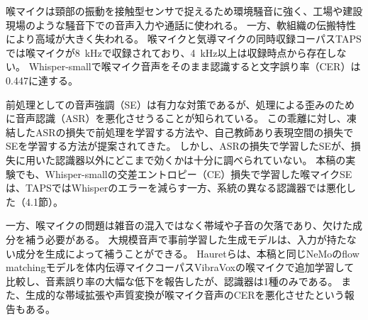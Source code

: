 \documentclass[xelatex,ja=standard,a4paper,twocolumn,10pt]{bxjsarticle}
\makeatletter
\renewcommand{\section}{\@startsection{section}{1}{\z@}{1.0ex plus .3ex}{.5ex}{\normalfont\large\sffamily\bfseries}}
\makeatother
\begin{document}

\section{はじめに}
喉マイクは頸部の振動を接触型センサで捉えるため環境騒音に強く、工場や建設現場のような騒音下での音声入力や通話に使われる。
一方、軟組織の伝搬特性により高域が大きく失われる。
喉マイクと気導マイクの同時収録コーパスTAPS\cite{taps}では喉マイクが8~kHzで収録されており、4~kHz以上は収録時点から存在しない。
Whisper-small\cite{whisper}で喉マイク音声をそのまま認識すると文字誤り率（CER）は0.447に達する。

前処理としての音声強調（SE）は有力な対策であるが、処理による歪みのために音声認識（ASR）を悪化させうることが知られている\cite{ochiai2024}。
この乖離に対し、凍結したASRの損失で前処理を学習する方法\cite{dissen2024}や、自己教師あり表現空間の損失でSEを学習する方法\cite{sato2025}が提案されてきた。
しかし、ASRの損失で学習したSEが、損失に用いた認識器以外にどこまで効くかは十分に調べられていない。
本稿の実験でも、Whisper-smallの交差エントロピー（CE）損失で学習した喉マイクSEは、TAPSではWhisperのエラーを減らす一方、系統の異なる認識器では悪化した（4.1節）。

一方、喉マイクの問題は雑音の混入ではなく帯域や子音の欠落であり、欠けた成分を補う必要がある。
大規模音声で事前学習した生成モデル\cite{ku2024}は、入力が持たない成分を生成によって補うことができる。
Hauretら\cite{hauret2025rt}は、本稿と同じNeMoのflow matchingモデルを体内伝導マイクコーパスVibraVoxの喉マイクで追加学習して比較し、音素誤り率の大幅な低下を報告したが、認識器は1種のみである。
また、生成的な帯域拡張や声質変換が喉マイク音声のCERを悪化させたという報告もある\cite{yamanaka2026}。
\end{document}
